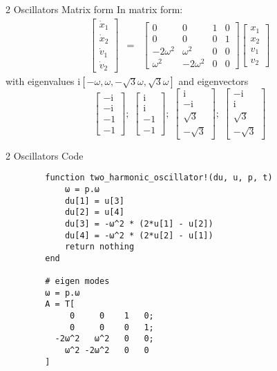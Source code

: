\documentclass[aspectratio=169]{beamer}
\newcommand{\im}{\mathrm{i}} %
\begin{document}
\begin{frame}{2 Oscillators Matrix form}
    In matrix form:
    \begin{eqnarray}
        \begin{bmatrix} \dot x_1 \\ \dot x_2 \\ \dot v_1 \\ \dot v_2 \end{bmatrix} 
            & = & \begin{bmatrix} 0 & 0 & 1 & 0 \\ 0 & 0 & 0 & 1 \\ -2\omega^2 & \omega^2 & 0 & 0 \\ \omega^2 & -2\omega^2 & 0 & 0 \end{bmatrix}
                    \begin{bmatrix}  x_1 \\  x_2 \\  v_1 \\  v_2 \end{bmatrix} 
    \end{eqnarray}
    \pause
    with eigenvalues $\im[-\omega, \omega, -\sqrt{3}\omega, \sqrt{3}\omega]$  and eigenvectors
    \begin{equation}
        \begin{bmatrix} -\im \\ -\im \\ -1 \\ -1 \end{bmatrix} ; \;  
        \begin{bmatrix} \im \\ \im \\ -1 \\ -1 \end{bmatrix} ; \;  
        \begin{bmatrix} \im \\ -\im \\ \sqrt{3} \\ -\sqrt{3} \end{bmatrix} ; \;  
        \begin{bmatrix} -\im \\ \im \\ \sqrt{3} \\ -\sqrt{3} \end{bmatrix}  \nonumber 
    \end{equation}
\end{frame}

\begin{frame}[fragile]{2 Oscillators Code}
    \begin{verbatim}
        function two_harmonic_oscillator!(du, u, p, t)
            ω = p.ω
            du[1] = u[3]
            du[2] = u[4]
            du[3] = -ω^2 * (2*u[1] - u[2])
            du[4] = -ω^2 * (2*u[2] - u[1])
            return nothing
        end

        # eigen modes
        ω = p.ω
        A = T[
             0     0    1   0;
             0     0    0   1;
          -2ω^2   ω^2   0   0;
            ω^2 -2ω^2   0   0
        ]
    \end{verbatim}
\end{frame}
\end{document}
